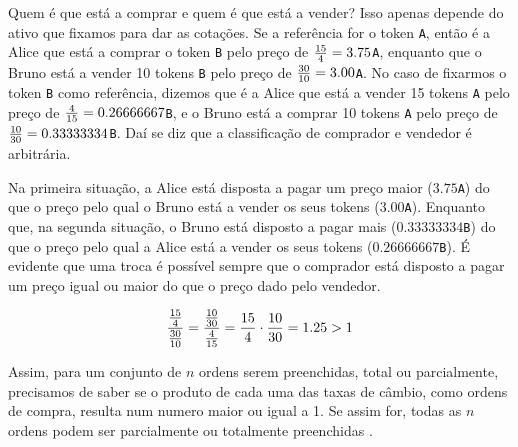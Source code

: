 \documentclass[UTF8,nofonts]{article}
\begin{document}
\begin{multicols}{2}
Quem é que está a comprar e quem é que está a vender? Isso apenas depende do ativo que fixamos para dar as cotações. Se a referência for o token \verb|A|, então é a Alice que está a comprar o token \verb|B| pelo preço de ${15 \over 4} = 3.75$\verb|A|, enquanto que o Bruno está a vender 10 tokens \verb|B| pelo preço de ${30 \over 10} = 3.00$\verb|A|. No caso de fixarmos o token \verb|B| como referência, dizemos que é a Alice que está a vender 15 tokens \verb|A| pelo preço de ${4\over 15}=0.26666667$\verb|B|, e o Bruno está a comprar 10 tokens \verb|A| pelo preço de ${10 \over 30}=0.33333334$\verb|B|. Daí se diz que a classificação de comprador e vendedor é arbitrária.

Na primeira situação, a Alice está disposta a pagar um preço maior ($3.75$\verb|A|) do que o preço pelo qual o Bruno está a vender os seus tokens ($3.00$\verb|A|). Enquanto que, na segunda situação, o Bruno está disposto a pagar mais ($0.33333334$\verb|B|) do que o preço pelo qual a Alice está a vender os seus tokens ($0.26666667$\verb|B|). É evidente que uma troca é possível sempre que o comprador está disposto a pagar um preço igual ou maior do que o preço dado pelo vendedor.

\begin{equation}
{{15\over 4} \over {30\over 10}} = {{10\over 30} \over {4\over 15}}={15 \over 4} \cdot {10 \over 30} = 1.25 > 1
\end{equation}

Assim, para um conjunto de $n$ ordens serem preenchidas, total ou parcialmente, precisamos de saber se o produto de cada uma das taxas de câmbio, como ordens de compra, resulta num numero maior ou igual a 1. Se assim for, todas as $n$ ordens podem ser parcialmente ou totalmente preenchidas \cite{supersymmetry}.


\end{multicols}
\end{document}
